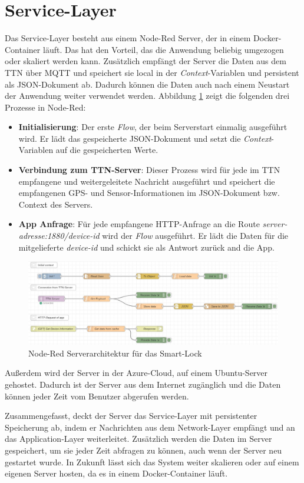 
\section{Service-Layer}
Das Service-Layer besteht aus einem Node-Red Server, der in einem Docker-Container läuft. Das hat den Vorteil, das die Anwendung beliebig umgezogen oder skaliert werden kann. Zusätzlich empfängt der Server die Daten aus dem \ac{TTN} über \ac{MQTT} und speichert sie local in der \emph{Context}-Variablen und persistent als \ac{JSON}-Dokument ab. Dadurch können die Daten auch nach einem Neustart der Anwendung weiter verwendet werden. Abbildung \ref{fig:node-red} zeigt die folgenden drei Prozesse in Node-Red:

\begin{itemize}
    \item \textbf{Initialisierung}: Der erste \emph{Flow}, der beim Serverstart einmalig ausgeführt wird. Er lädt das gespeicherte \ac{JSON}-Dokument und setzt die \emph{Context}-Variablen auf die gespeicherten Werte.
    \item \textbf{Verbindung zum \ac{TTN}-Server}: Dieser Prozess wird für jede im \ac{TTN} empfangene und weitergeleitete Nachricht ausgeführt und speichert die empfangenen \ac{GPS}- und Sensor-Informationen im \ac{JSON}-Dokument bzw. Context des Servers.
    \item \textbf{App Anfrage}: Für jede empfangene \ac{HTTP}-Anfrage an die Route \emph{server-adresse:1880/device-id} wird der \emph{Flow} ausgeführt. Er lädt die Daten für die mitgelieferte \emph{device-id} und schickt sie als Antwort zurück and die App.
\end{itemize}

\begin{figure}[!htbp]
    \centering
    \includegraphics[width=1\linewidth]{images/node-red.jpg}
    \caption[Node-Red Serverarchitektur für das Smart-Lock]{Node-Red Serverarchitektur für das Smart-Lock}
    \label{fig:node-red}
\end{figure}

Außerdem wird der Server in der Azure-Cloud, auf einem Ubuntu-Server gehostet. Dadurch ist der Server aus dem Internet zugänglich und die Daten können jeder Zeit vom Benutzer abgerufen werden.

Zusammengefasst, deckt der Server das Service-Layer mit persistenter Speicherung ab, indem er Nachrichten aus dem Network-Layer empfängt und an das Application-Layer weiterleitet. Zusätzlich werden die Daten im Server gespeichert, um sie jeder Zeit abfragen zu können, auch wenn der Server neu gestartet wurde. In Zukunft lässt sich das System weiter skalieren oder auf einem eigenen Server hosten, da es in einem Docker-Container läuft.
